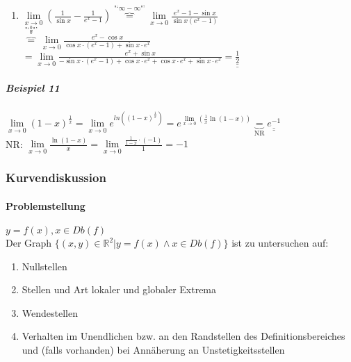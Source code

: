 \documentclass[a4paper]{scrartcl}
\begin{document}
\begin{enumerate}
\item $\lim\limits_{x \to 0} ( \frac{1}{\sin{x}} - \frac{1}{e^x -1} ) \overbrace{=}^{\text{"`} \infty - \infty \text{"'}} \lim\limits_{x \to 0} \frac{e^x -1 - \sin{x}}{\sin{x} (e^x -1)}$\\
$\overbrace{=}^{\text{"`}\frac{0}{0}\text{"'}} \lim\limits_{x \to 0} \frac{e^x - \cos{x}}{\cos{x} \cdot (e^x -1) + \sin{x} \cdot e^x}$\\
$= \lim\limits_{x \to 0} \frac{e^x + \sin{x}}{- \sin{x} \cdot (e^x -1 ) + \cos{x} \cdot e^x + \cos{x} \cdot e^x + \sin{x} \cdot e^x} = \underline{\underline{\frac{1}{2}}}$
\end{enumerate}

\subparagraph{Beispiel 11}
$\lim\limits_{x \to 0} (1-x)^{\frac{1}{x}} = \lim\limits_{x \to 0} e^{ln{((1-x)^{\frac{1}{x}})}} = e^{\lim\limits_{x \to 0} ( \frac{1}{x} \ln{(1-x)})} \underbrace{=}_{\text{NR}} \underline{\underline{e^{-1}}}$\\
NR: $\lim\limits_{x \to 0} \frac{\ln{(1-x)}}{x} = \lim\limits_{x \to 0} \frac{\frac{1}{1-x} \cdot (-1)}{1} = -1$

\subsubsection{Kurvendiskussion}
\paragraph{Problemstellung} $y = f(x), x \in Db(f)$\\
Der Graph $\{(x,y) \in \mathbb{R}^2 | y= f(x) \wedge x \in Db(f)\}$ ist zu untersuchen auf:
\begin{enumerate}
\item Nullstellen
\item Stellen und Art lokaler und globaler Extrema
\item Wendestellen
\item Verhalten im Unendlichen bzw. an den Randstellen des Definitionsbereiches und (falls vorhanden) bei Annäherung an Unstetigkeitsstellen
\end{enumerate}
\end{document}
